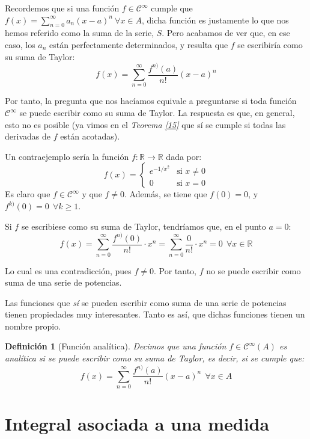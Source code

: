 \documentclass[11pt, a4paper]{article}
\theoremstyle{theorem-style}
\theoremstyle{definition-style}
\newtheorem{ndef}{Definición}[section]
\theoremstyle{remark-style}
\theoremstyle{example-style}
\begin{document}
Recordemos que si una función $f \in \mathcal{C}^{\infty}$ cumple que $f(x) = \sum_{n=0}^{\infty} a_n(x-a)^n\ \forall x \in A$, dicha función es justamente lo que nos hemos referido como la suma de la serie, $S$. Pero acabamos de ver que, en ese caso, los $a_n$ están perfectamente determinados, y resulta que $f$ se escribiría como su suma de Taylor: $$f(x) = \sum_{n=0}^{\infty} \frac{f^{n)}(a)}{n!} (x-a)^n$$

Por tanto, la pregunta que nos hacíamos equivale a preguntarse si toda función $\mathcal{C}^{\infty}$ se puede escribir como su suma de Taylor. La respuesta es que, en general, esto no es posible (ya vimos en el \textit{Teorema \ref{15}} que sí se cumple si todas las derivadas de $f$ están acotadas).

Un contraejemplo sería la función $f: \mathbb{R} \longrightarrow \mathbb{R}$ dada por: $$f(x) = \begin{cases}
  e^{-1/x^2} & \text{si } x\ne 0\\
  0 & \text{si } x=0
\end{cases}$$ Es claro que $f \in \mathcal{C}^{\infty}$ y que $f \ne 0$. Además, se tiene que $f(0) = 0$, y $f^{k)}(0) = 0\ \ \forall k \ge 1$. 

Si $f$ se escribiese como su suma de Taylor, tendríamos que, en el punto $a=0$: $$f(x) = \sum_{n=0}^{\infty} \frac{f^{n)}(0)}{n!} \cdot x^n =  \sum_{n=0}^{\infty} \frac{0}{n!}\cdot x^n = 0\ \ \forall x \in \mathbb{R}$$

Lo cual es una contradicción, pues $f\ne 0$. Por tanto, $f$ no se puede escribir como suma de una serie de potencias.

Las funciones que \textit{sí} se pueden escribir como suma de una serie de potencias tienen propiedades muy interesantes. Tanto es así, que dichas funciones tienen un nombre propio.

\begin{ndef}[Función analítica] Decimos que una función $f \in \mathcal{C}^{\infty}(A)$ es analítica si se puede escribir como su suma de Taylor, es decir, si se cumple que: $$f(x) = \sum_{n=0}^{\infty} \frac{f^{n)}(a)}{n!}(x-a)^n\ \ \forall x \in A$$
\end{ndef}

\newpage



\section{Integral asociada a una medida}
\end{document}
